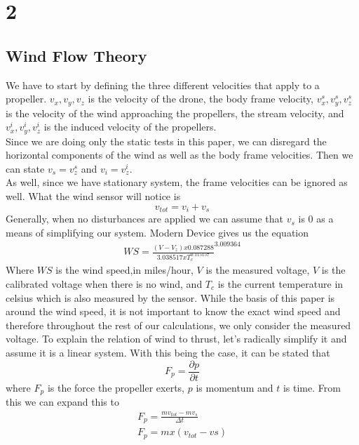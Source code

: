 \documentclass[conference]{IEEEtran}
\begin{document}
\section{2}
\subsection{Wind Flow Theory}
We have to start by defining the three different velocities that apply to a propeller.
$v_x , v_y , v_z$ is the velocity of the drone, the body frame velocity, $v^s_{x} , v^s_{y} , v^s_{z}$ is the velocity of the wind approaching the propellers, the stream velocity, and $ v^i_{x} , v^i_{y} , v^i_{z}$ is the induced velocity of the propellers.\\
Since we are doing only the static tests in this paper, we can disregard the horizontal components of the wind as well as the body frame velocities. Then we can state $v_s = v^s_{z}$ and $ v_i = v^i_{z} $.\\
As well, since we have stationary system, the frame velocities can be ignored as well. What the wind sensor will notice is 
\begin{equation}
v_{tot} = v_{i} + v_{s}
\label{vtot}
\end{equation}	
Generally, when no disturbances are applied we can assume that $v_s$ is $0$ as a means of simplifying our system.
Modern Device \cite{md} gives us the equation 
\begin{eqnarray}
WS = \frac{(V - V_{z})x0.087288}{3.038517 x T_{c} ^{0.115157}} ^ {3.009364}
\label{wind_speed}
\end{eqnarray}
Where $WS$ is the wind speed,in miles/hour, $V$ is the measured voltage, $V$ is the calibrated voltage when there is no wind, and $T_c$ is the current temperature in celsius which is also measured by the sensor. While the basis of this paper is around the wind speed, it is not important to know the exact wind speed and therefore throughout the rest of our calculations, we only consider the measured voltage. 
To explain the relation of wind to thrust, let's radically simplify it and assume it is a linear system.  With this being the case, it can be stated that 
\begin{equation}
F_p= \frac{\partial p}{\partial t}
\label{fvm}
\end{equation}
where $F_p$ is the force the propeller exerts, $p$ is momentum and $t$ is time. From this we can expand this to 
\begin{eqnarray}
F_p= \frac{mv_{tot} - mv_{s}}{\Delta t}\\ 
\label{fvm2}
F_p= mx(v_{tot}-v{s}) 
\label{fvm3}
\end{eqnarray}
\end{document}
